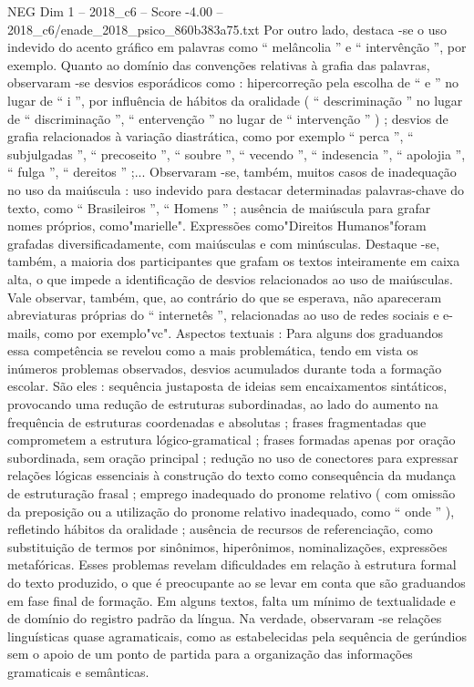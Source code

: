\begin{textsample}{NEG Dim 1 – 2018\_c6 – Score -4.00 – 2018\_c6/enade\_2018\_psico\_860b383a75.txt}
Por outro lado, destaca -se o uso indevido do acento gráfico em palavras como “ melâncolia ” e “ intervênção ”, por exemplo.
Quanto ao domínio das convenções relativas à grafia das palavras, observaram -se desvios esporádicos como : hipercorreção pela escolha de “ e ” no lugar de “ i ”, por influência de hábitos da oralidade ( “ descriminação ” no lugar de “ discriminação ”, “ entervenção ” no lugar de “ intervenção ” ) ; desvios de grafia relacionados à variação diastrática, como por exemplo “ perca ”, “ subjulgadas ”, “ precoseito ”, “ soubre ”, “ vecendo ”, “ indesencia ”, “ apolojia ”, “ fulga ”, “ dereitos ” ;...
Observaram -se, também, muitos casos de inadequação no uso da maiúscula : uso indevido para destacar determinadas palavras-chave do texto, como “ Brasileiros ”, “ Homens ” ; ausência de maiúscula para grafar nomes próprios, como"marielle".
Expressões como"Direitos Humanos"foram grafadas diversificadamente, com maiúsculas e com minúsculas.
Destaque -se, também, a maioria dos participantes que grafam os textos inteiramente em caixa alta, o que impede a identificação de desvios relacionados ao uso de maiúsculas.
Vale observar, também, que, ao contrário do que se esperava, não apareceram abreviaturas próprias do “ internetês ”, relacionadas ao uso de redes sociais e e-mails, como por exemplo"vc".
Aspectos textuais : Para alguns dos graduandos essa competência se revelou como a mais problemática, tendo em vista os inúmeros problemas observados, desvios acumulados durante toda a formação escolar.
São eles : sequência justaposta de ideias sem encaixamentos sintáticos, provocando uma redução de estruturas subordinadas, ao lado do aumento na frequência de estruturas coordenadas e absolutas ; frases fragmentadas que comprometem a estrutura lógico-gramatical ; frases formadas apenas por oração subordinada, sem oração principal ; redução no uso de conectores para expressar relações lógicas essenciais à construção do texto como consequência da mudança de estruturação frasal ; emprego inadequado do pronome relativo ( com omissão da preposição ou a utilização do pronome relativo inadequado, como “ onde ” ), refletindo hábitos da oralidade ; ausência de recursos de referenciação, como substituição de termos por sinônimos, hiperônimos, nominalizações, expressões metafóricas.
Esses problemas revelam dificuldades em relação à estrutura formal do texto produzido, o que é preocupante ao se levar em conta que são graduandos em fase final de formação.
Em alguns textos, falta um mínimo de textualidade e de domínio do registro padrão da língua.
Na verdade, observaram -se relações linguísticas quase agramaticais, como as estabelecidas pela sequência de gerúndios sem o apoio de um ponto de partida para a organização das informações gramaticais e semânticas.

\end{textsample}
